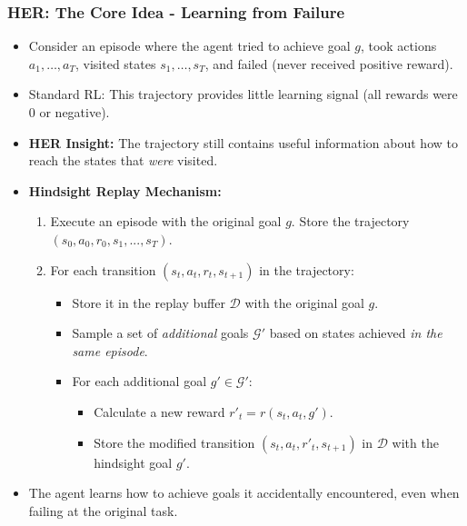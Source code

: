 \documentclass[9pt, aspectratio=169]{beamer}
\begin{document}
\begin{frame}
  \frametitle{HER: The Core Idea - Learning from Failure}
  \begin{itemize}
    \item Consider an episode where the agent tried to achieve goal $g$, took actions $a_1, \dots, a_T$, visited states $s_1, \dots, s_T$, and failed (never received positive reward).
    \item Standard RL: This trajectory provides little learning signal (all rewards were 0 or negative).

    \item \textbf{HER Insight:} The trajectory still contains useful information about how to reach the states that \textit{were} visited.
    \item \textbf{Hindsight Replay Mechanism:}
        \begin{enumerate}
            \item Execute an episode with the original goal $g$. Store the trajectory $(s_0, a_0, r_0, s_1, ..., s_T)$.
            \item For each transition $(s_t, a_t, r_t, s_{t+1})$ in the trajectory:
                \begin{itemize}
                    \item Store it in the replay buffer $\mathcal{D}$ with the original goal $g$.
                    \item Sample a set of \textit{additional} goals $\mathcal{G}'$ based on states achieved \textit{in the same episode}.
                    \item For each additional goal $g' \in \mathcal{G}'$:
                        \begin{itemize}
                            \item Calculate a new reward $r'_t = r(s_t, a_t, g')$.
                            \item Store the modified transition $(s_t, a_t, r'_t, s_{t+1})$ in $\mathcal{D}$ with the hindsight goal $g'$.
                        \end{itemize}
                \end{itemize}
        \end{enumerate}
    \item The agent learns how to achieve goals it accidentally encountered, even when failing at the original task.
  \end{itemize}
\end{frame}
\end{document}
